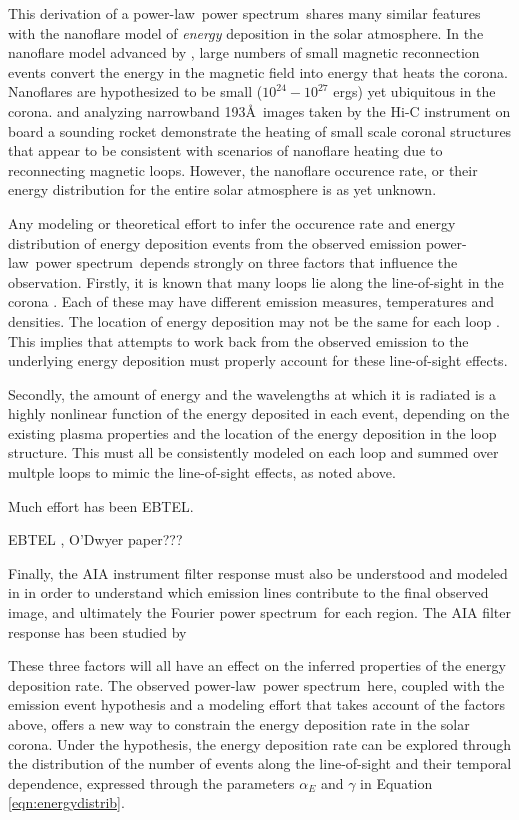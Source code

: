 \documentclass{aastex}
\newcommand{\PS}{power spectrum}
\newcommand{\PL}{power-law}
\newcommand{\Fps}{Fourier \PS}
\begin{document}
This derivation of a \PL\ \PS\ shares many similar features with the
nanoflare model of {\it energy} deposition in the solar atmosphere. In
the nanoflare model advanced by \cite{1988ApJ...330..474P}, large
numbers of small magnetic reconnection events convert the energy in
the magnetic field into energy that heats the corona.  Nanoflares are
hypothesized to be small ($10^{24}-10^{27}$ ergs) yet ubiquitous in
the corona.  \cite{2013ApJ...771...21W} and \cite{2013ApJ...770L...1T}
analyzing narrowband 193\AA\ images taken by the Hi-C instrument on
board a sounding rocket demonstrate the heating of small scale coronal
structures that appear to be consistent with scenarios of nanoflare
heating due to reconnecting magnetic loops.  However, the nanoflare
occurence rate, or their energy distribution for the entire solar
atmosphere is as yet unknown.

Any modeling or theoretical effort to infer the occurence rate and
energy distribution of energy deposition events from the observed
emission \PL\ \PS\ depends strongly on three factors that influence
the observation.  Firstly, it is known that many loops lie along the
line-of-sight in the corona \citep{???}.  Each of these may have
different emission measures, temperatures and densities.  The location
of energy deposition may not be the same for each loop \citep{???}.
This implies that attempts to work back from the observed emission to
the underlying energy deposition must properly account for these
line-of-sight effects.


Secondly, the amount of energy and the wavelengths at which it is
radiated is a highly nonlinear function of the energy deposited in
each event, depending on the existing plasma properties and the
location of the energy deposition in the loop structure.  This must
all be consistently modeled on each loop and summed over multple loops
to mimic the line-of-sight effects, as noted above.  

Much effort has
been \cite{???} EBTEL.

EBTEL , O'Dwyer paper???

Finally, the AIA instrument filter response must also be understood
and modeled in in order to understand which emission lines contribute
to the final observed image, and ultimately the \Fps\ for each
region.  The AIA filter response has been studied by
\cite{2010AA...521A..21O}  


These three factors will all have an effect on the inferred properties
of the energy deposition rate.  The observed \PL\ \PS\ here, coupled
with the emission event hypothesis and a modeling effort that takes
account of the factors above, offers a new way to constrain the energy
deposition rate in the solar corona.  Under the hypothesis, the energy
deposition rate can be explored through the distribution of the number
of events along the line-of-sight and their temporal dependence,
expressed through the parameters $\alpha_{E}$ and $\gamma$ in Equation
\ref{eqn:energydistrib}.
\end{document}
